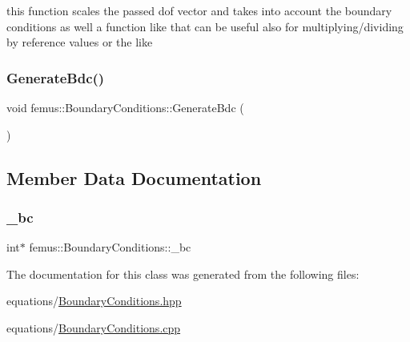 this function scales the passed dof vector and takes into account the boundary conditions as well a function like that can be useful also for multiplying/dividing by reference values or the like \mbox{\label{classfemus_1_1_boundary_conditions_a8dd3678ce76bb1723e03deca11e273ae}} 
\subsubsection{\texorpdfstring{Generate\+Bdc()}{GenerateBdc()}}
{\footnotesize\ttfamily void femus\+::\+Boundary\+Conditions\+::\+Generate\+Bdc (\begin{DoxyParamCaption}{ }\end{DoxyParamCaption})}



\subsection{Member Data Documentation}
\mbox{\label{classfemus_1_1_boundary_conditions_ad269ae59ac9ff09c60e1d6a6958f1811}} 
\subsubsection{\texorpdfstring{\+\_\+bc}{\_bc}}
{\footnotesize\ttfamily int$\ast$ femus\+::\+Boundary\+Conditions\+::\+\_\+bc}



The documentation for this class was generated from the following files\+:\begin{DoxyCompactItemize}
\item 
equations/\mbox{\hyperlink{_boundary_conditions_8hpp}{Boundary\+Conditions.\+hpp}}\item 
equations/\mbox{\hyperlink{_boundary_conditions_8cpp}{Boundary\+Conditions.\+cpp}}\end{DoxyCompactItemize}
